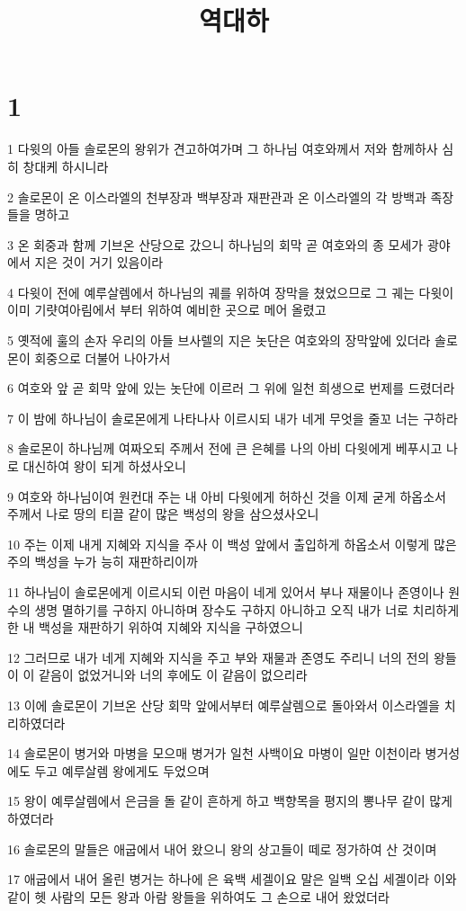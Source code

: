 

\title{역대하}


\chapter{1}

\par 1 다윗의 아들 솔로몬의 왕위가 견고하여가며 그 하나님 여호와께서 저와 함께하사 심히 창대케 하시니라
\par 2 솔로몬이 온 이스라엘의 천부장과 백부장과 재판관과 온 이스라엘의 각 방백과 족장들을 명하고
\par 3 온 회중과 함께 기브온 산당으로 갔으니 하나님의 회막 곧 여호와의 종 모세가 광야에서 지은 것이 거기 있음이라
\par 4 다윗이 전에 예루살렘에서 하나님의 궤를 위하여 장막을 쳤었으므로 그 궤는 다윗이 이미 기럇여아림에서 부터 위하여 예비한 곳으로 메어 올렸고
\par 5 옛적에 훌의 손자 우리의 아들 브사렐의 지은 놋단은 여호와의 장막앞에 있더라 솔로몬이 회중으로 더불어 나아가서
\par 6 여호와 앞 곧 회막 앞에 있는 놋단에 이르러 그 위에 일천 희생으로 번제를 드렸더라
\par 7 이 밤에 하나님이 솔로몬에게 나타나사 이르시되 내가 네게 무엇을 줄꼬 너는 구하라
\par 8 솔로몬이 하나님께 여짜오되 주께서 전에 큰 은혜를 나의 아비 다윗에게 베푸시고 나로 대신하여 왕이 되게 하셨사오니
\par 9 여호와 하나님이여 원컨대 주는 내 아비 다윗에게 허하신 것을 이제 굳게 하옵소서 주께서 나로 땅의 티끌 같이 많은 백성의 왕을 삼으셨사오니
\par 10 주는 이제 내게 지혜와 지식을 주사 이 백성 앞에서 출입하게 하옵소서 이렇게 많은 주의 백성을 누가 능히 재판하리이까
\par 11 하나님이 솔로몬에게 이르시되 이런 마음이 네게 있어서 부나 재물이나 존영이나 원수의 생명 멸하기를 구하지 아니하며 장수도 구하지 아니하고 오직 내가 너로 치리하게 한 내 백성을 재판하기 위하여 지혜와 지식을 구하였으니
\par 12 그러므로 내가 네게 지혜와 지식을 주고 부와 재물과 존영도 주리니 너의 전의 왕들이 이 같음이 없었거니와 너의 후에도 이 같음이 없으리라
\par 13 이에 솔로몬이 기브온 산당 회막 앞에서부터 예루살렘으로 돌아와서 이스라엘을 치리하였더라
\par 14 솔로몬이 병거와 마병을 모으매 병거가 일천 사백이요 마병이 일만 이천이라 병거성에도 두고 예루살렘 왕에게도 두었으며
\par 15 왕이 예루살렘에서 은금을 돌 같이 흔하게 하고 백향목을 평지의 뽕나무 같이 많게 하였더라
\par 16 솔로몬의 말들은 애굽에서 내어 왔으니 왕의 상고들이 떼로 정가하여 산 것이며
\par 17 애굽에서 내어 올린 병거는 하나에 은 육백 세겔이요 말은 일백 오십 세겔이라 이와 같이 헷 사람의 모든 왕과 아람 왕들을 위하여도 그 손으로 내어 왔었더라

